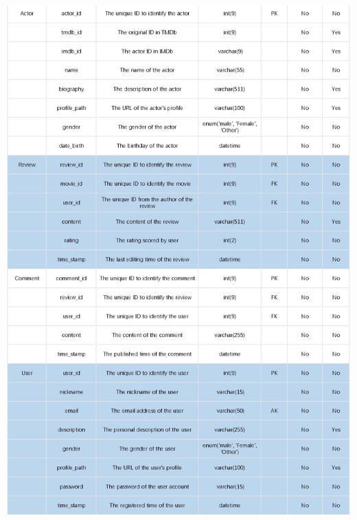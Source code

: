 \documentclass[12pt]{article}
\begin{document}
\includegraphics[width=1\linewidth]{a2.jpg}
\end{document}
